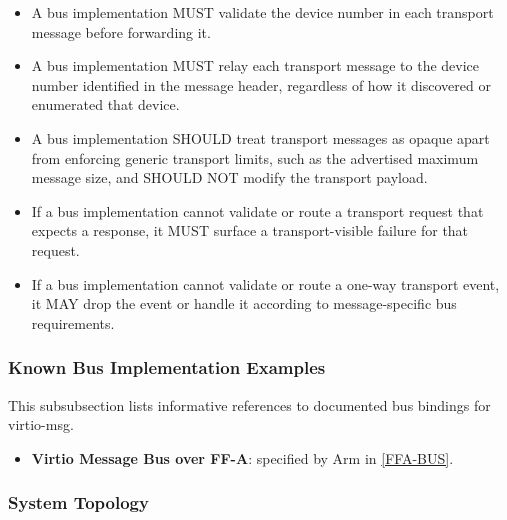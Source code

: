 \begin{itemize}
  \item A bus implementation MUST validate the device number in each transport
        message before forwarding it.
  \item A bus implementation MUST relay each transport message to the device
        number identified in the message header, regardless of how it
        discovered or enumerated that device.
  \item A bus implementation SHOULD treat transport messages as opaque apart
        from enforcing generic transport limits, such as the advertised maximum
        message size, and SHOULD NOT modify the transport payload.
  \item If a bus implementation cannot validate or route a transport request
        that expects a response, it MUST surface a transport-visible failure
        for that request.
  \item If a bus implementation cannot validate or route a one-way transport
        event, it MAY drop the event or handle it according to
        message-specific bus requirements.
\end{itemize}

\subsubsection{Known Bus Implementation Examples}
\label{sec:Virtio Transport Options / Virtio Over Messages / Basic Concepts / Known Bus Implementation Examples}

This subsubsection lists informative references to documented bus bindings for
virtio-msg.

\begin{itemize}
  \item \textbf{Virtio Message Bus over FF-A}: specified by Arm in
        \hyperref[intro:FFA-BUS]{[FFA-BUS]}.
\end{itemize}

\subsubsection{System Topology}

